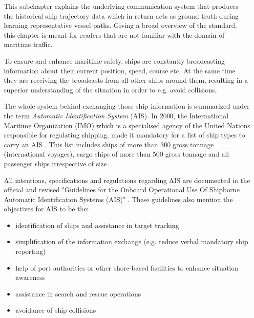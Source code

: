 This subchapter explains the underlying communication system that produces the historical ship trajectory data which in return acts as ground truth during learning representative vessel paths. Giving a broad overview of the standard, this chapter is meant for readers that are not familiar with the domain of maritime traffic.
\par
To ensure and enhance maritime safety, ships are constantly broadcasting information about their current position, speed, course etc. At the same time they are receiving the broadcasts from all other ships around them, resulting in a superior understanding of the situation in order to e.g. avoid collisions. 
\par
The whole system behind exchanging those ship information is summarized under the term \textit{Automatic Identification System} (AIS). In 2000, the International Maritime Organization (IMO) which is a specialised agency of the United Nations responsible for regulating shipping, made it mandatory for a list of ship types to carry an AIS \cite[]{imo}. This list includes ships 
of more than 300 gross tonnage (international voyages), cargo ships of more than 500 gross tonnage and all passenger ships irrespective of size \cite[]{imo}.
\par
All intentions, specifications and regulations regarding AIS are documented in the official and revised "Guidelines for the Onboard Operational Use Of
Shipborne Automatic Identification Systems (AIS)" \cite[]{international2015revised}. These guidelines also mention the objectives for AIS to be the:
\begin{itemize}
    \item identification of ships and assistance in target tracking
    \item simplification of the information exchange (e.g. reduce verbal mandatory ship reporting)
    \item help of port authorities or other shore-based facilities to enhance situation awareness
    \item assistance in search and rescue operations
    \item avoidance of ship collisions
\end{itemize}

